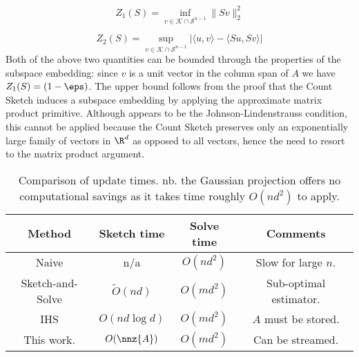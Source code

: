 \begin{equation} \label{eq: sketch-lower-distortion}
  Z_1(S) = \inf_{v \in \mathcal{K} \cap \mathcal{S}^{n-1}} \| Sv \|_2^2
\end{equation}

\begin{equation} \label{eq: sketch-upper-distortion}
 Z_2(S) = \sup_{v \in \mathcal{K} \cap \mathcal{S}^{n-1}} \left| \langle u,v \rangle
                 - \langle Su, Sv \rangle \right|
\end{equation}
Both of the above two quantities can be bounded through the properties of the
subspace embedding: since $v$ is a unit vector in the column span of $A$ we have
$Z_1(S) = (1 - \eps) $.
The upper bound follows from the proof that the Count Sketch induces a subspace
embedding by applying the approximate matrix product primitive.
Although appears to be the Johnson-Lindenstrauss condition, this cannot be applied
because the Count Sketch preserves only an exponentially large family of vectors
in $\R^d$ as opposed to all vectors, hence the need to resort to the matrix product
argument.


\begin{table}
  \centering
\begin{tabular}{ |c|c|c|c| }
 \hline
 Method             & Sketch time             & Solve time   & Comments  \\
 \hline
 Naive              &      n/a                &   $O(nd^2)$  & Slow for large $n$. \\
 Sketch-and-Solve  &     $\tilde{O}(nd)$      &    $O(md^2)$ &  Sub-optimal estimator. \\
 IHS              &     $O(nd \log d)$     &    $O(md^2)$ &  $A$ must be stored. \\
 This work.       &   $O(\nnz{A})$           &    $O(md^2)$   &  Can be streamed.\\
 \hline
\end{tabular}
\caption{Comparison of update times. nb. the Gaussian projection offers no computational
savings as it takes time roughly $O(nd^2)$ to apply.}
\label{fig: update-times}
\end{table}
